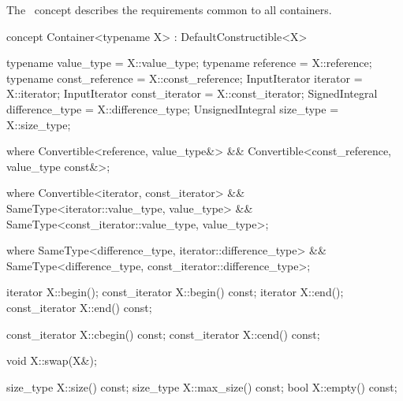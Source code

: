 \documentclass[american,twoside]{book}
\begin{document}
\pnum
{}

\pnum
{}


\color{addclr}

\color{black}
\color{addclr}

\pnum
{} \color{addclr} The \ concept
describes the requirements common to all containers.

\begin{itemdecl}
concept Container<typename X> : DefaultConstructible<X>
{
  typename value_type =            X::value_type;
  typename reference =             X::reference;
  typename const_reference =       X::const_reference;
  InputIterator iterator =         X::iterator;
  InputIterator const_iterator =   X::const_iterator;
  SignedIntegral difference_type = X::difference_type;
  UnsignedIntegral size_type =     X::size_type;

  where Convertible<reference, value_type&> &&
        Convertible<const_reference, value_type const&>;

  where Convertible<iterator, const_iterator> &&
        SameType<iterator::value_type, value_type> &&
        SameType<const_iterator::value_type, value_type>;
 
  where SameType<difference_type, iterator::difference_type> &&
        SameType<difference_type, const_iterator::difference_type>;

  iterator       X::begin();
  const_iterator X::begin() const;
  iterator       X::end();
  const_iterator X::end() const;

  const_iterator X::cbegin() const;
  const_iterator X::cend() const;

  void X::swap(X&);

  size_type X::size() const;
  size_type X::max_size() const;
  bool X::empty() const;
}
\end{itemdecl}
\end{document}
